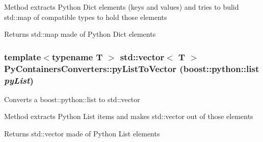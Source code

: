 Method extracts Python Dict elements (keys and values) and tries to bulid std::map of compatible types to hold those elements \begin{DoxyReturn}{Returns}
std::map made of Python Dict elements 
\end{DoxyReturn}
\hypertarget{namespace_py_containers_converters_a8f3d92c41544fc4ee156509eaaf68729}{
\subsubsection[{pyListToVector}]{\setlength{\rightskip}{0pt plus 5cm}template$<$typename T $>$ std::vector$<$ T $>$ PyContainersConverters::pyListToVector (boost::python::list {\em pyList})}}
\label{namespace_py_containers_converters_a8f3d92c41544fc4ee156509eaaf68729}
Converts a boost::python::list to std::vector

Method extracts Python List items and makes std::vector out of those elements \begin{DoxyReturn}{Returns}
std::vector made of Python List elements 
\end{DoxyReturn}
